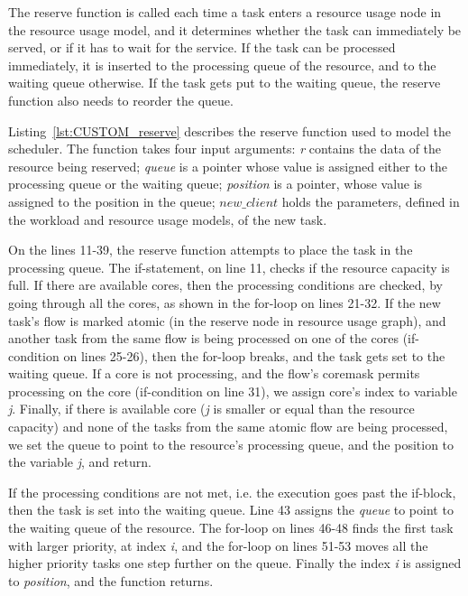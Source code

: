 The reserve function is called each time a task enters a resource usage node in the resource usage model, and it determines whether the task can immediately be served, or if it has to wait for the service. If the task can be processed immediately, it is inserted to the processing queue of the resource, and to the waiting queue otherwise. If the task gets put to the waiting queue, the reserve function also needs to reorder the queue.

Listing~\ref{lst:CUSTOM_reserve} describes the reserve function used to model the scheduler. The function takes four input arguments: \emph{r} contains the data of the resource being reserved; \emph{queue} is a pointer whose value is assigned either to the processing queue or the waiting queue; \emph{position} is a pointer, whose value is assigned to the position in the queue; \emph{$new\_client$} holds the parameters, defined in the workload and resource usage models, of the new task.



On the lines 11-39, the reserve function attempts to place the task in the processing queue. The if-statement, on line 11, checks if the resource capacity is full. If there are available cores, then the processing conditions are checked, by going through all the cores, as shown in the for-loop on lines 21-32. If the new task's flow is marked atomic (in the reserve node in resource usage graph), and another task from the same flow is being processed on one of the cores (if-condition on lines 25-26), then the for-loop breaks, and the task gets set to the waiting queue. If a core is not processing, and the flow's coremask permits processing on the core (if-condition on line 31), we assign core's index to variable \emph{j}. Finally, if there is available core (\emph{j} is smaller or equal than the resource capacity) and none of the tasks from the same atomic flow are being processed, we set the queue to point to the resource's processing queue, and the position to the variable \emph{j}, and return.

If the processing conditions are not met, i.e. the execution goes past the if-block, then the task is set into the waiting queue. Line 43 assigns the \emph{queue} to point to the waiting queue of the resource. The for-loop on lines 46-48 finds the first task with larger priority, at index \emph{i}, and the for-loop on lines 51-53 moves all the higher priority tasks one step further on the queue. Finally the index \emph{i} is assigned to \emph{position}, and the function returns.

